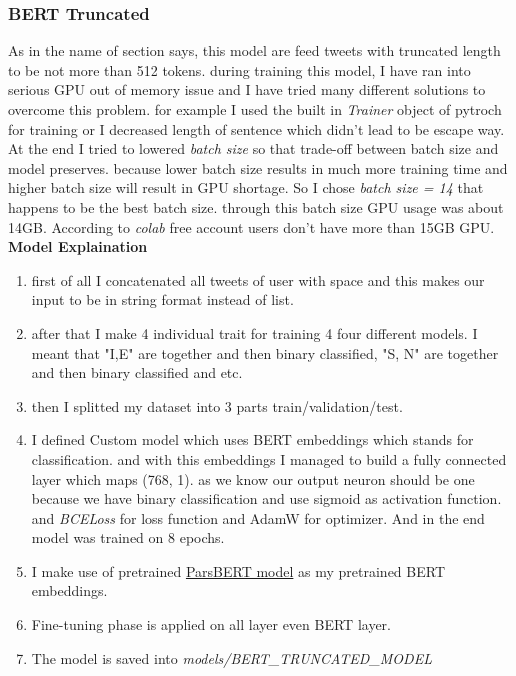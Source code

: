 \documentclass[10pt, a4paper]{article}
\begin{document}
\subsubsection{BERT Truncated}
As in the name of section says, this model are feed tweets with truncated length to be not more than 512 tokens. during training this model, I have ran into serious GPU out of memory issue and
I have tried many different solutions to overcome this problem. for example I used the built in \textit{Trainer} object of pytroch for training or I decreased length of sentence which didn't lead
to be escape way. At the end I tried to lowered \textit{batch size} so that trade-off between batch size and model preserves. because lower batch size results in much more training time and higher
batch size will result in GPU shortage. So I chose \textit{batch size = 14} that happens to be the best batch size. through this batch size GPU usage was about 14GB. According to \textit{colab} free
account users don't have more than 15GB GPU.
\\

\textbf{Model Explaination}
\begin{enumerate}
    \item first of all I concatenated all tweets of user with space and this makes our input to be in string format instead of list.
    \item after that I make 4 individual trait for training 4 four different models. I meant that "I,E" are together and then binary classified, "S, N" are together and then binary classified and etc.
    \item then I splitted my dataset into 3 parts train/validation/test.
    \item I defined Custom model which uses BERT  embeddings which stands for classification. and with this embeddings I managed to build a fully connected layer which maps (768, 1). as we
          know our output neuron should be one because we have binary classification and use sigmoid as activation function. and \textit{BCELoss} for loss function and AdamW for optimizer. And in the end model was trained on 8 epochs.
    \item I make use of pretrained \href{https://huggingface.co/HooshvareLab/bert-fa-base-uncased}{ParsBERT model} as my pretrained BERT embeddings.
    \item Fine-tuning phase is applied on all layer even BERT layer.
    \item The model is saved into \textit{models/BERT\_TRUNCATED\_MODEL}
\end{enumerate}
\end{document}
